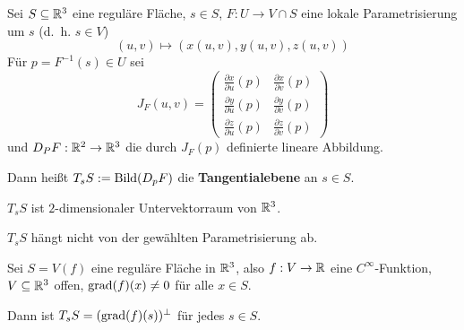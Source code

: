 \begin{definition}%
    Sei $S \subseteq \mathbb{R}^3$ eine reguläre Fläche, $s \in S$,
    $F: U \rightarrow V \cap S$ eine lokale Parametrisierung um $s$
    (d.~h. $s \in V$)
    \[(u,v) \mapsto (x(u,v), y(u,v), z(u,v))\]
    Für $p=F^{-1}(s) \in U$ sei
    \[        J_F(u,v) = \begin{pmatrix}
            \frac{\partial x}{\partial u} (p) & \frac{\partial x}{\partial v} (p)\\
            \frac{\partial y}{\partial u} (p) & \frac{\partial y}{\partial v} (p)\\
            \frac{\partial z}{\partial u} (p) & \frac{\partial z}{\partial v} (p)
        \end{pmatrix}\]
    und $D_P F: \mathbb{R}^2 \rightarrow \mathbb{R}^3$ die durch $J_F (p)$
    definierte lineare Abbildung.

    Dann heißt $T_s S := \operatorname{Bild}(D_p F)$ die \textbf{Tangentialebene}
    an $s \in S$.
\end{definition}

\begin{bemerkung}%
    \begin{bemenum}
        \item $T_s S$ ist $2$-dimensionaler Untervektorraum von $\mathbb{R}^3$.%
        \item $T_s S$ hängt nicht von der gewählten Parametrisierung ab.%
        \item Sei $S=V(f)$ eine reguläre Fläche in $\mathbb{R}^3$, also %
                $f:V \rightarrow \mathbb{R}$ eine $C^\infty$-Funktion, $V \subseteq \mathbb{R}^3$
                offen, $\operatorname{grad}(f)(x) \neq 0$ für alle $x \in S$.

                Dann ist $T_s S = (\operatorname{grad}(f)(s))^\perp$ für jedes $s \in S$.
    \end{bemenum}
\end{bemerkung}

